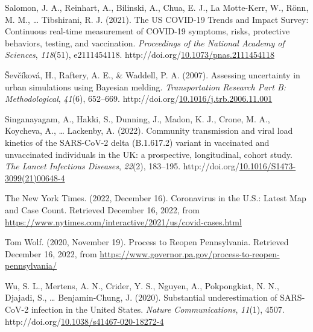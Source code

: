 \documentclass[12pt,twoside]{smiththesis}
\newlength{\cslhangindent}
\newenvironment{CSLReferences}[2] %
 {%
\setlength{\parindent}{0pt}
\ifodd #1 \everypar{\setlength{\hangindent}{\cslhangindent}}\ignorespaces\fi
\ifnum #2 > 0
\setlength{\parskip}{#2\baselineskip}
  \fi
}%
{}
\begin{document}
\begin{CSLReferences}{1}{0}
\leavevmode{}%
Salomon, J. A., Reinhart, A., Bilinski, A., Chua, E. J., La Motte-Kerr, W., Rönn, M. M., \ldots{} Tibshirani, R. J. (2021). The US COVID-19 Trends and Impact Survey: Continuous real-time measurement of COVID-19 symptoms, risks, protective behaviors, testing, and vaccination. \emph{Proceedings of the National Academy of Sciences}, \emph{118}(51), e2111454118. http://doi.org/\href{https://doi.org/10.1073/pnas.2111454118}{10.1073/pnas.2111454118}

\leavevmode{}%
Ševčíková, H., Raftery, A. E., \& Waddell, P. A. (2007). Assessing uncertainty in urban simulations using Bayesian melding. \emph{Transportation Research Part B: Methodological}, \emph{41}(6), 652--669. http://doi.org/\href{https://doi.org/10.1016/j.trb.2006.11.001}{10.1016/j.trb.2006.11.001}

\leavevmode{}%
Singanayagam, A., Hakki, S., Dunning, J., Madon, K. J., Crone, M. A., Koycheva, A., \ldots{} Lackenby, A. (2022). Community transmission and viral load kinetics of the SARS-CoV-2 delta (B.1.617.2) variant in vaccinated and unvaccinated individuals in the UK: a prospective, longitudinal, cohort study. \emph{The Lancet Infectious Diseases}, \emph{22}(2), 183--195. http://doi.org/\href{https://doi.org/10.1016/S1473-3099(21)00648-4}{10.1016/S1473-3099(21)00648-4}

\leavevmode{}%
The New York Times. (2022, December 16). Coronavirus in the U.S.: Latest Map and Case Count. Retrieved December 16, 2022, from \url{https://www.nytimes.com/interactive/2021/us/covid-cases.html}

\leavevmode{}%
Tom Wolf. (2020, November 19). Process to Reopen Pennsylvania. Retrieved December 16, 2022, from \url{https://www.governor.pa.gov/process-to-reopen-pennsylvania/}

\leavevmode{}%
Wu, S. L., Mertens, A. N., Crider, Y. S., Nguyen, A., Pokpongkiat, N. N., Djajadi, S., \ldots{} Benjamin-Chung, J. (2020). Substantial underestimation of SARS-CoV-2 infection in the United States. \emph{Nature Communications}, \emph{11}(1), 4507. http://doi.org/\href{https://doi.org/10.1038/s41467-020-18272-4}{10.1038/s41467-020-18272-4}

\end{CSLReferences}

\end{document}
